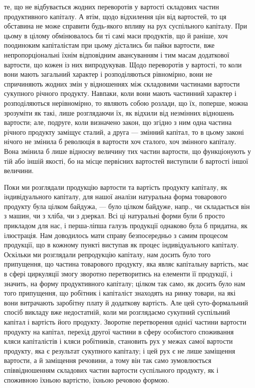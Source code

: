 \parcont{}  %
те, що не відбувається жодних переворотів у вартості складових частин
продуктивного капіталу. А втім, щодо відхилення цін від вартостей, то
ця обставина не може справити будь-якого впливу на рух суспільного
капіталу. При цьому в цілому обмінювалось би ті самі маси продуктів,
що й раніше, хоч поодиноким капіталістам при цьому дістались би пайки
вартости, вже непропорціональні їхнім відповідним авансуванням і тим масам
додаткової вартости, що кожен із них випродукував. Щодо переворотів
у вартості, то коли вони мають загальний характер і розподіляються
рівномірно, вони не спричиняють жодних змін у відношеннях між
складовими частинами вартости сукупного річного продукту. Навпаки, коли
вони мають частинний характер і розподіляються нерівномірно, то являють
собою розлади, що їх, поперше, можна зрозуміти як такі, лише розглядаючи
їх, як відхили від незмінних відношень вартости; але, подруге,
коли визначено закон, що згідно з ним одна частина річного продукту заміщує
сталий, а друга — змінний капітал, то в цьому законі нічого не
змінила б революція в вартости хоч сталого, хоч змінного капіталу. Вона
змінила б лише відносну величину тих частин вартости, що функціонують
у тій або іншій якості, бо на місце первісних вартостей виступили
б вартості іншої величини.

Поки ми розглядали продукцію вартости та вартість продукту капіталу,
як індивідуального капіталу, для нашої аналізи натуральна форма
товарового продукту була цілком байдужа, — було цілком байдуже, напр.,
чи складається він з машин, чи з хліба, чи з дзеркал. Всі ці натуральні
форми були б просто прикладом для нас, і перша-ліпша галузь продукції
однаково була б придатна, як ілюстрація. Нам доводилось мати
справу безпосередньо з самим процесом продукції, що в кожному пункті
виступав як процес індивідуального капіталу. Оскільки ми розглядали
репродукцію капіталу, нам досить було того припущення, що частина
товарового продукту, яка являє капітальну вартість, має в сфері циркуляції
змогу зворотно перетворитись на елементи її продукції, і значить,
на форму продуктивного капіталу; цілком так само, як досить було нам
того припущення, що робітник і капіталіст знаходять на ринку товари,
на які вони витрачають заробітну плату й додаткову вартість. Але цей
суто-формальний спосіб викладу вже недостатній, коли ми розглядаємо
сукупний суспільний капітал і вартість його продукту. Зворотне перетворення
однієї частини вартости продукту на капітал, перехід другої частини в
сферу особистого споживання кляси капіталістів і кляси робітників, становить
рух у межах самої вартости продукту, яка є результат сукупного
капіталу; і цей рух є не лише заміщення вартости, а й заміщення речовини,
а тому він так само зумовлюється співвідношенням складових
частин вартости суспільного продукту, як і споживною їхньою вартістю,
їхньою речовою формою.

